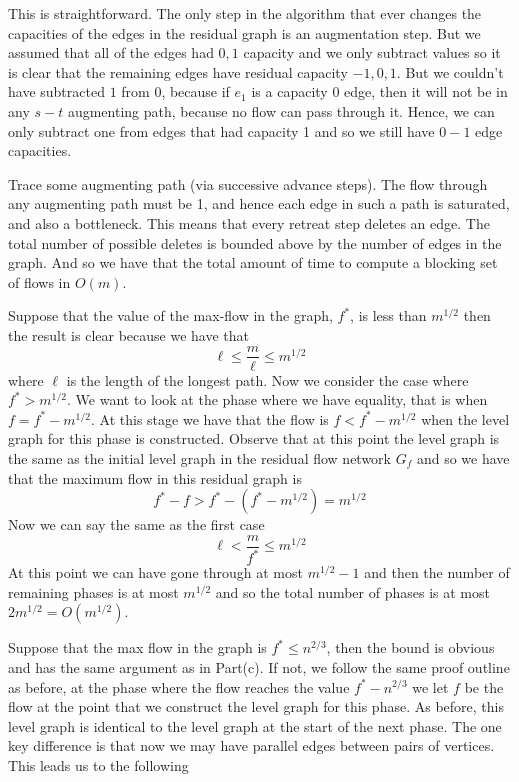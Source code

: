 \documentclass{article}
\newcommand{\problem}[1]{\noindent {\bf #1}}
\newcommand{\problempart}[1]{\noindent{\textbf{(#1)}}}
\begin{document}
\problem{Problem 1.}

\problempart{a} This is straightforward. The only step in the algorithm that ever changes the capacities of the edges in the residual graph is an augmentation step. But we assumed that all of the edges had $0,1$ capacity and we only subtract values so it is clear that the remaining edges have residual capacity $-1,0,1$. But we couldn't have subtracted $1$ from $0$, because if $e_1$ is a capacity 0 edge, then it will not be in any $s-t$ augmenting path, because no flow can pass through it. Hence, we can only subtract one from edges that had capacity 1 and so we still have $0-1$ edge capacities. 

\problempart{b} Trace some augmenting path (via successive advance steps). The flow through any augmenting path must be 1, and hence each edge in such a path is saturated, and also a bottleneck. This means that every retreat step deletes an edge. The total number of possible deletes is bounded above by the number of edges in the graph. And so we have that the total amount of time to compute a blocking set of flows in $O(m)$.

\problempart{c} Suppose that the value of the max-flow in the graph, $f^*$, is less than $m^{1/2}$ then the result is clear because we have that 
\[
\ell \leq \frac{m}{\ell} \leq m^{1/2}
\]
where $\ell$ is the length of the longest path. Now we consider the case where $f^* > m^{1/2}$. We want to look at the phase where we have equality, that is when $f = f^* - m^{1/2}$. At this stage we have that the flow is $f < f^* - m^{1/2}$ when the level graph for this phase is constructed. Observe that at this point the level graph is the same as the initial level graph in the residual flow network $G_f$ and so we have that the maximum flow in this residual graph is
\[
f^* - f > f^* - (f^* - m^{1/2}) = m^{1/2}
\]
Now we can say the same as the first case
\[
\ell < \frac{m}{f^*} \leq m^{1/2}
\]
At this point we can have gone through at most $m^{1/2} - 1$ and then the number of remaining phases is at most $m^{1/2}$ and so the total number of phases is at most $2m^{1/2} = O(m^{1/2})$.

\problempart{d} Suppose that the max flow in the graph is $f^* \leq n^{2/3}$, then the bound is obvious and has the same argument as in Part(c). If not, we follow the same proof outline as before, at the phase where the flow reaches the value $f^* - n^{2/3}$ we let $f$ be the flow at the point that we construct the level graph for this phase. As before, this level graph is identical to the level graph at the start of the next phase. The one key difference is that now we may have parallel edges between pairs of vertices. This leads us to the following\\
\end{document}
